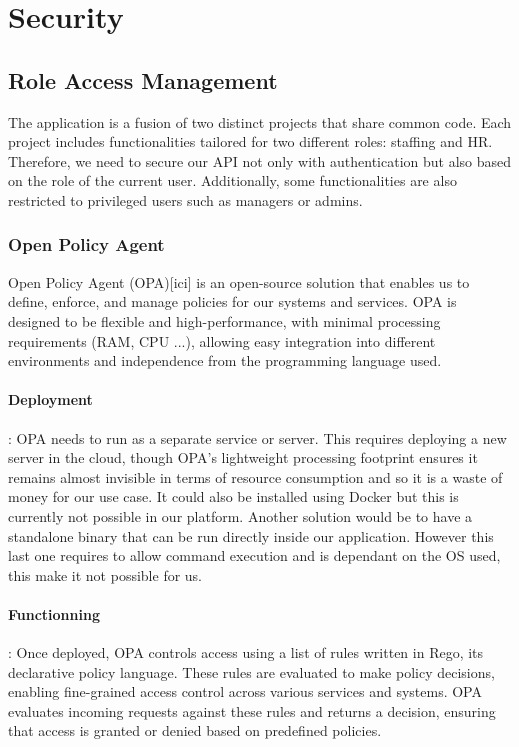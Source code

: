 \section{Security}

\subsection{Role Access Management}
The application is a fusion of two distinct projects that share common code. Each project includes functionalities tailored for two different roles: staffing and HR. Therefore, we need to secure our API not only with authentication but also based on the role of the current user. Additionally, some functionalities are also restricted to privileged users such as managers or admins. 


\subsubsection{Open Policy Agent}

Open Policy Agent (OPA)[ici] is an open-source solution that enables us to define, enforce, and manage policies for our systems and services. OPA is designed to be flexible and high-performance, with minimal processing requirements (RAM, CPU ...), allowing easy integration into different environments and independence from the programming language used. 


\paragraph{Deployment}: OPA needs to run as a separate service or server. This requires deploying a new server in the cloud, though OPA's lightweight processing footprint ensures it remains almost invisible in terms of resource consumption and so it is a waste of money for our use case. It could also be installed using Docker but this is currently not possible in our platform. Another solution would be to have a standalone binary that can be run directly inside our application. However this last one requires to allow command execution and is dependant on the OS used, this make it not possible for us. 


\paragraph{Functionning}: Once deployed, OPA controls access using a list of rules written in Rego, its declarative policy language. These rules are evaluated to make policy decisions, enabling fine-grained access control across various services and systems. OPA evaluates incoming requests against these rules and returns a decision, ensuring that access is granted or denied based on predefined policies. 


